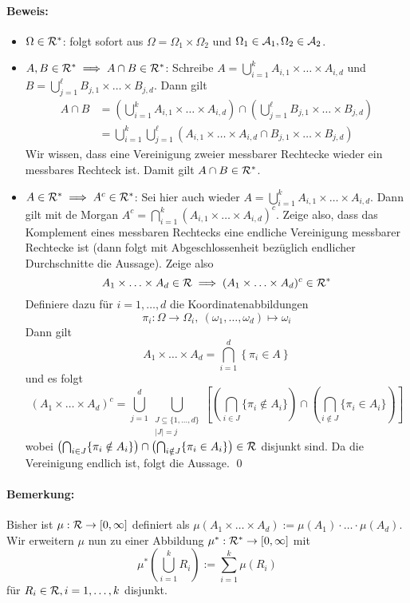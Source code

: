 \paragraph{Beweis:}
\begin{itemize}
    \item $\Omega\in\mathcal{R}^*$: folgt sofort aus $\Omega=\Omega_1\times\Omega_2$ und $\Omega_1\in\mathcal{A}_1,\Omega_2\in\mathcal{A}_2$.
    \item $A,B\in\mathcal{R}^*\implies A\cap B\in\mathcal{R}^*$: Schreibe $A=\bigcup_{i=1}^kA_{i,1}\times\hdots\times A_{i,d}$ und $B=\bigcup_{j=1}^\ell B_{j,1}\times\hdots\times B_{j,d}$. Dann gilt
    \begin{align*}
        A\cap B&=\left(\bigcup_{i=1}^kA_{i,1}\times\hdots\times A_{i,d}\right)\cap\left(\bigcup_{j=1}^\ell B_{j,1}\times\hdots\times B_{j,d}\right)\\
        &=\bigcup_{i=1}^k\bigcup_{j=1}^\ell\left(A_{i,1}\times\hdots\times A_{i,d}\cap B_{j,1}\times\hdots\times B_{j,d}\right)
    \end{align*}
    Wir wissen, dass eine Vereinigung zweier messbarer Rechtecke wieder ein messbares Rechteck ist. Damit gilt $A\cap B\in\mathcal{R}^*$.
    \item $A\in\mathcal{R}^*\implies A^c\in\mathcal{R}^*$: Sei hier auch wieder $A=\bigcup_{i=1}^kA_{i,1}\times\hdots\times A_{i,d}$. Dann gilt mit de Morgan $A^c=\bigcap_{i=1}^k(A_{i,1}\times\hdots\times A_{i,d})^c$. Zeige also, dass das Komplement eines messbaren Rechtecks eine endliche Vereinigung messbarer Rechtecke ist (dann folgt mit Abgeschlossenheit bez\"uglich endlicher Durchschnitte die Aussage). Zeige also
    $$A_1\times\hdots\times A_d\in\mathcal{R}\implies(A_1\times\hdots\times A_d)^c\in\mathcal{R}^*$$
    Definiere dazu f\"ur $i=1,\hdots,d$ die Koordinatenabbildungen
    $$\pi_i:\Omega\to\Omega_i,\ (\omega_1,\hdots,\omega_d)\mapsto\omega_i$$
    Dann gilt
    $$A_1\times\hdots\times A_d=\bigcap_{i=1}^d\left\{\pi_i\in A\right\}$$
    und es folgt
    $$(A_1\times\hdots\times A_d)^c=\bigcup_{j=1}^d\bigcup_{\substack{J\subseteq\{1,\hdots,d\}\\|J|=j}}\left[\left(\bigcap_{i\in J}\{\pi_i\notin A_i\}\right)\cap\left(\bigcap_{i\notin J}\{\pi_i\in A_i\}\right)\right]$$
    wobei $\left(\bigcap_{i\in J}\{\pi_i\notin A_i\}\right)\cap\left(\bigcap_{i\notin J}\{\pi_i\in A_i\}\right)\in\mathcal{R}$ disjunkt sind. Da die Vereinigung endlich ist, folgt die Aussage. \qed
\end{itemize}

\paragraph{Bemerkung:} Bisher ist $\mu:\mathcal{R}\to[0,\infty]$ definiert als $\mu(A_1\times\hdots\times A_d):=\mu(A_1)\cdot\hdots\cdot\mu(A_d)$. Wir erweitern $\mu$ nun zu einer Abbildung $\mu^*:\mathcal{R}^*    \to[0,\infty]$ mit 
$$\displaystyle\mu^*\left(\bigcup_{i=1}^k R_i\right):=\sum_{i=1}^k\mu(R_i)$$ f\"ur $R_i\in\mathcal{R},i=1,\hdots,k$ disjunkt.


